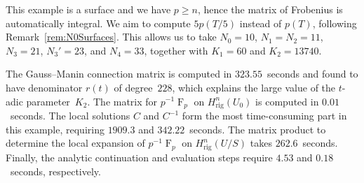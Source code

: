 \documentclass[a4paper,11pt]{article}
\numberwithin{equation}{section}
\DeclareMathOperator{\Frob}{F}           %
\providecommand{\Hrig}{H_{\text{rig}}}  %
\theoremstyle{definition}
\begin{document}
This example is a surface and we have $p \geq n$, hence the matrix of Frobenius 
is automatically integral.  We aim to compute $5 p(T/5)$ instead of $p(T)$, 
following Remark~\ref{rem:N0Surfaces}.  This allows us to take $N_0 = 10$, 
$N_1 = N_2 = 11$, $N_3 = 21$, $N_3' = 23$, and $N_4 = 33$, together with 
$K_1 = 60$ and $K_2 = 13740$.

The Gauss--Manin connection matrix is computed in $323.55$~seconds and found 
to have denominator $r(t)$ of degree~$228$, which explains the large value 
of the $t$-adic parameter~$K_2$.  The matrix for $p^{-1} \Frob_p$ on 
$\Hrig^{n}(U_0)$ is computed in $0.01$~seconds.  The local 
solutions $C$ and $C^{-1}$ form the most time-consuming part in this example, 
requiring $1909.3$ and $342.22$~seconds.  The matrix product to determine the 
local expansion of $p^{-1} \Frob_p$ on $\Hrig^{n}(U/S)$ 
takes $262.6$~seconds. Finally, the analytic continuation and evaluation steps 
require $4.53$ and $0.18$~seconds, respectively.





\end{document}
